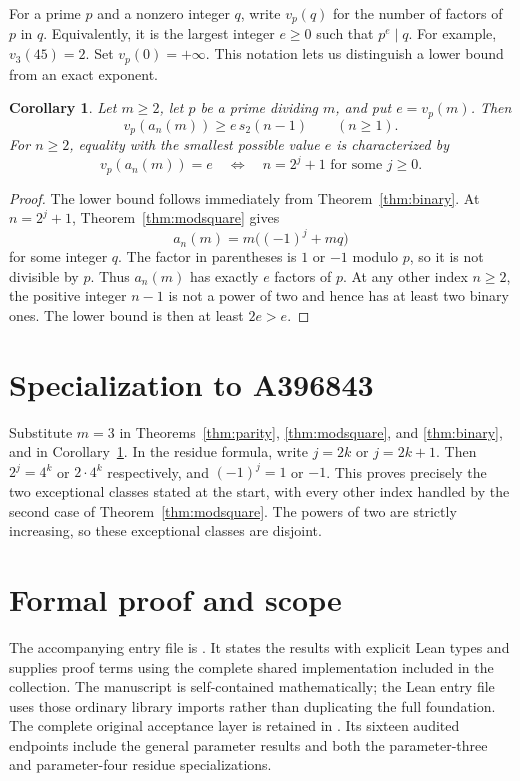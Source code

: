 \documentclass[11pt,a4paper]{article}
\newtheorem{corollary}[theorem]{Corollary}
\theoremstyle{remark}\newtheorem{remark}[theorem]{Remark}
\begin{document}
For a prime $p$ and a nonzero integer $q$, write $v_p(q)$ for the number
of factors of $p$ in $q$. Equivalently, it is the largest integer $e\ge0$
such that $p^e\mid q$. For example, $v_3(45)=2$. Set $v_p(0)=+\infty$.
This notation lets us distinguish a lower bound from an exact exponent.

\begin{corollary}\label{cor:valuation}
Let $m\ge2$, let $p$ be a prime dividing $m$, and put $e=v_p(m)$. Then
\[
 v_p(a_n(m))\ge e\,s_2(n-1)\qquad(n\ge1).
\]
For $n\ge2$, equality with the smallest possible value $e$ is characterized by
\begin{equation}\label{eq:minval}
 v_p(a_n(m))=e
 \quad\Longleftrightarrow\quad
 n=2^j+1\text{ for some }j\ge0.
\end{equation}
\end{corollary}

\begin{proof}
The lower bound follows immediately from Theorem~\ref{thm:binary}.
At $n=2^j+1$, Theorem~\ref{thm:modsquare} gives
\[
 a_n(m)=m\bigl((-1)^j+mq\bigr)
\]
for some integer $q$. The factor in parentheses is $1$ or $-1$ modulo $p$,
so it is not divisible by $p$. Thus $a_n(m)$ has exactly $e$ factors of $p$.
At any other index $n\ge2$, the positive integer $n-1$ is not a power
of two and hence has at least two binary ones. The lower bound is then
at least $2e>e$.
\end{proof}


\section{Specialization to A396843}
Substitute $m=3$ in Theorems~\ref{thm:parity},
\ref{thm:modsquare}, and \ref{thm:binary}, and in
Corollary~\ref{cor:valuation}. In the residue formula, write
$j=2k$ or $j=2k+1$. Then $2^j=4^k$ or $2\cdot4^k$ respectively,
and $(-1)^j=1$ or $-1$. This proves precisely the two exceptional
classes stated at the start, with every other index handled by the
second case of Theorem~\ref{thm:modsquare}. The powers of two are
strictly increasing, so these exceptional classes are disjoint.

\section{Formal proof and scope}
The accompanying entry file is .
It states the results with explicit Lean types and supplies proof terms
using the complete shared implementation included in the collection.
The manuscript is self-contained mathematically; the Lean entry file uses
those ordinary library imports rather than duplicating the full foundation.
The complete original acceptance layer is retained in . Its sixteen audited endpoints include the general parameter results and both the parameter-three and parameter-four residue specializations.
\end{document}
